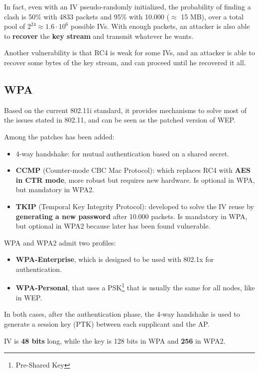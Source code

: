 \documentclass[oneside]{academica}
\begin{document}
\newpage

In fact, even with an IV pseudo-randomly initialized, the probability of finding a clash is 50\% with 4833 packets and 95\% with 10.000 ($\approx$ 15 MB), over a total pool of $2^{24} \approx 1.6 \cdot 10^6$ possible IVs.
With enough packets, an attacker is also able to \textbf{recover} the \textbf{key stream} and transmit whatever he wants.

Another vulnerability is that RC4 is weak for some IVs, and an attacker is able to recover some bytes of the key stream, and can proceed until he recovered it all.

\subsection{WPA}

Based on the current 802.11i standard, it provides mechanisms to solve most of the issues stated in 802.11, and can be seen as the patched version of WEP.

Among the patches has been added:
\begin{itemize}
  \item 4-way handshake: for mutual authentication based on a shared secret.
  \item \textbf{CCMP} (Counter-mode CBC Mac Protocol): which replaces RC4 with \textbf{AES in CTR mode}, more robust but requires new hardware. Is optional in WPA, but mandatory in WPA2.
  \item \textbf{TKIP} (Temporal Key Integrity Protocol): developed to solve the IV reuse by \textbf{generating a new password} after 10.000 packets. Is mandatory in WPA, but optional in WPA2 because later has been found vulnerable.
\end{itemize}

WPA and WPA2 admit two profiles:
\begin{itemize}
  \item \textbf{WPA-Enterprise}, which is designed to be used with 802.1x for authentication.
  \item \textbf{WPA-Personal}, that uses a PSK\footnote{Pre-Shared Key} that is usually the same for all nodes, like in WEP.
\end{itemize}

In both cases, after the authentication phase, the 4-way handshake is used to generate a session key (PTK) between each supplicant and the AP.

IV is \textbf{48 bits} long, while the key is 128 bits in WPA and \textbf{256} in WPA2.
\end{document}

